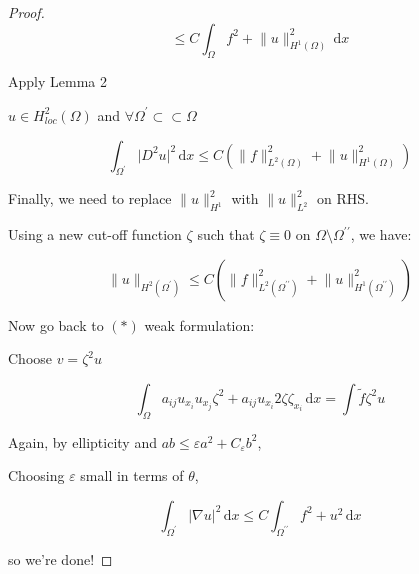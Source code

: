 \documentclass{article}
\theoremstyle{definition}
\begin{document}
\begin{proof}
\[
    \leq C \int_{\Omega} f^2 + \lVert u \rVert ^2 _ {H^1(\Omega)} \,\mathrm{d}x 
\]


Apply Lemma 2

\(u\in H^2_{loc} (\Omega)\) and \(\forall \Omega ^{\prime} \subset \subset \Omega\) 

\[
    \int_{\Omega^{\prime}} \vert D^2 u \vert ^ 2 \,\mathrm{d}x \leq  C \left( \lVert f \rVert ^ 2 _{L^2(\Omega)} + \lVert u \rVert ^ 2 _{H^1(\Omega)} \right) 
\]

Finally, we need to replace \(\lVert u \rVert ^2 _{H^1}\) with \(\lVert u \rVert ^2_{L^2}\) on RHS.

Using a new cut-off function \(\zeta\) such that \(\zeta \equiv 0\) on \(\Omega \setminus \Omega^{\prime\prime}\), we have:

\[
    \lVert u \rVert _{H^2(\Omega^{\prime})} \leq C \left( \lVert f \rVert ^ 2_{L^2(\Omega^{\prime\prime})} + \lVert u \rVert ^2 _{H^1(\Omega ^{\prime\prime} )} \right) 
\]

Now go back to \((\ast)\) weak formulation:

Choose \(v = \zeta ^2 u\)

\[
    \int_{\Omega} a_{ij} u_{x_i} u_{x_j} \zeta ^ 2 + a_{ij} u_{x_i} 2 \zeta \zeta_{x_i}  \,\mathrm{d}x = \int \tilde{f} \zeta^2 u
\]

Again, by ellipticity and \(ab \leq \varepsilon a ^ 2 + C_{\varepsilon} b^2\),

Choosing \(\varepsilon\) small in terms of \(\theta\),

\[
    \int_{\Omega^{\prime}} \vert \nabla u \vert ^ 2 \,\mathrm{d}x \leq C \int_{\Omega^{\prime\prime} } f^2 + u^2 \,\mathrm{d}x 
\]

so we're done!

\end{proof}
\end{document}

